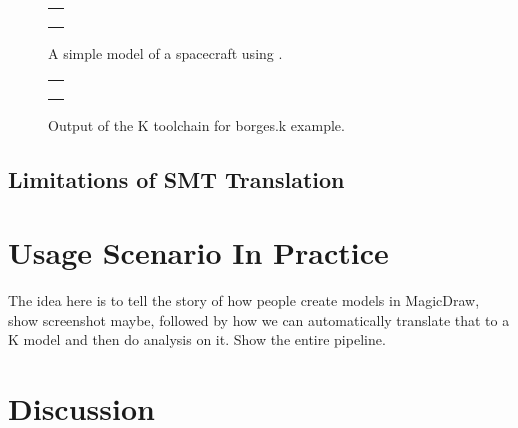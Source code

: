 \documentclass{llncs}
\begin{document}
\begin{figure}
\centering
\begin{tabular}{c}
\hline \\
 \\ \\
\hline
\end{tabular}
\caption{A simple model of a spacecraft using \Klang{}.}
\label{fig:spacecraftSmt}
\end{figure}

\begin{figure}
\centering
\begin{tabular}{c}
\hline \\
 \\ \\
\hline
\end{tabular}
\caption{Output of the K toolchain for borges.k example.}
\label{fig:shapes}
\end{figure}

\subsection{Limitations of SMT Translation}

\section{Usage Scenario In Practice}

The idea here is to tell the story of how people create models in
MagicDraw, show screenshot maybe, followed by how we can automatically
translate that to a K model and then do analysis on it. Show the
entire pipeline.

\section{Discussion}








\appendix


\end{document}
